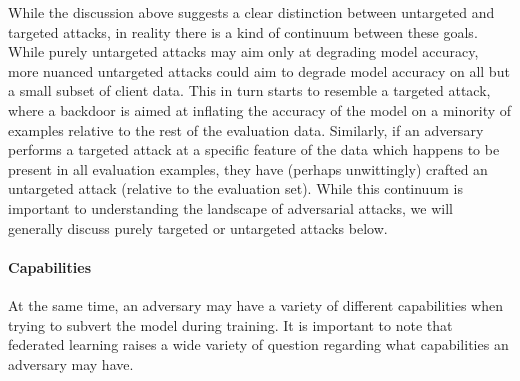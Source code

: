 \documentclass[11pt]{article}
\begin{document}
While the discussion above suggests a clear distinction between untargeted and targeted attacks, in reality there is a kind of continuum between these goals. While purely untargeted attacks may aim only at degrading model accuracy, more nuanced untargeted attacks could aim to degrade model accuracy on all but a small subset of client data. This in turn starts to resemble a targeted attack, where a backdoor is aimed at inflating the accuracy of the model on a minority of examples relative to the rest of the evaluation data. Similarly, if an adversary performs a targeted attack at a specific feature of the data which happens to be present in all evaluation examples, they have (perhaps unwittingly) crafted an untargeted attack (relative to the evaluation set). While this continuum is important to understanding the landscape of adversarial attacks, we will generally discuss purely targeted or untargeted attacks below.


\paragraph{Capabilities}
At the same time, an adversary may have a variety of different capabilities when trying to subvert the model during training. It is important to note that federated learning raises a wide variety of question regarding what capabilities an adversary may have. 
\end{document}
